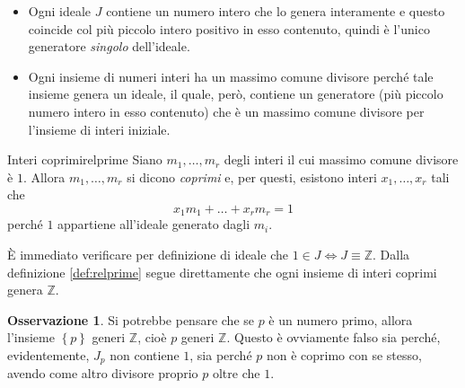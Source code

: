 \documentclass[11pt, a4paper]{scrartcl}
\theoremstyle{definition}
\numberwithin{esempio}{section}
\theoremstyle{definition}
\newtheorem{obs}{Osservazione}
\numberwithin{obs}{section}
\numberwithin{nota}{section}
\numberwithin{equation}{subsection}
\begin{document}
\begin{itemize}
	\item Ogni ideale $J$ contiene un numero intero che lo genera interamente e questo coincide col pi\`u piccolo intero positivo in esso contenuto, quindi \`e l'unico generatore \textit{singolo} dell'ideale.
	\item Ogni insieme di numeri interi ha un massimo comune divisore perch\'e tale insieme genera un ideale, il quale, per\`o, contiene un generatore (pi\`u piccolo numero intero in esso contenuto) che \`e un massimo comune divisore per l'insieme di interi iniziale.
\end{itemize}
\begin{definizione}
	{Interi coprimi}{relprime}
	Siano $m_1,\ldots,m_r$ degli interi il cui massimo comune divisore \`e $1$. 
	Allora $m_1,\ldots,m_r$ si dicono \textit{coprimi} e, per questi, esistono interi $x_1,\ldots,x_r$ tali che
	\[
	x_1m_1   +\ldots + x_r m_r = 1
	\] 
	perch\'e $1$ appartiene all'ideale generato dagli $m_i$.
\end{definizione}
\`E immediato verificare per definizione di ideale che $1 \in  J \iff J \equiv \mathbb{Z}$.
Dalla definizione \ref{def:relprime} segue direttamente che ogni insieme di interi coprimi genera $\mathbb{Z}$.
\begin{obs}
	Si potrebbe pensare che se $p$ \`e un numero primo, allora l'insieme $\left\{ p \right\} $ generi $\mathbb{Z}$, cio\`e $p$ generi $\mathbb{Z}$. 
	Questo \`e ovviamente falso sia perch\'e, evidentemente, $J_p$ non contiene $1$, sia perch\'e $p$ non \`e coprimo con se stesso, avendo come altro divisore proprio $p$ oltre che $1$.
\end{obs}
\end{document}
